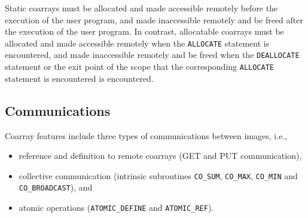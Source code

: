 %     

\requirement
Static coarrays must be allocated and made accessible remotely
before the execution of the user program, and 
made inaccessible remotely and be freed after the execution of the user program.
In contrast, 
allocatable coarrays must be allocated and made accessible remotely
when the {\tt ALLOCATE} statement is encountered, and 
made inaccessible remotely and be freed when the {\tt DEALLOCATE} statement or 
the exit point of the scope that the corresponding {\tt ALLOCATE} statement is encountered 
is encountered.


\subsection{Communications}\label{sec:spec-comm}

Coarray features include three types of communications between images, i.e.,
\begin{itemize}
\item reference and definition to remote coarrays (GET and PUT communication),
\item collective communication (intrinsic subroutines {\tt CO\_SUM}, {\tt CO\_MAX}, 
{\tt CO\_MIN} and {\tt CO\_BROADCAST}), and
\item atomic operations ({\tt ATOMIC\_DEFINE} and {\tt ATOMIC\_REF}).
\end{itemize}

